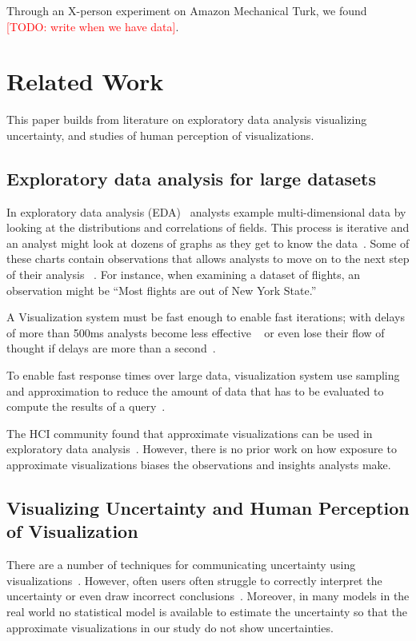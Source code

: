 \documentclass[10pt,journal,compsoc]{IEEEtran}
\newcommand{\note}[2]{\textcolor{#1}{[#2]}}
\newcommand{\todo}[1]{\note{red}{TODO: #1}}
\begin{document}
Through an X-person experiment on Amazon Mechanical Turk, we found \todo{write when we have data}.

\section{Related Work}\label{sec:related_work}

This paper builds from literature on exploratory data analysis visualizing uncertainty, and studies of human perception of visualizations.

\subsection{Exploratory data analysis for large datasets}

In exploratory data analysis (EDA)~\cite{tukey1977exploratory} analysts example multi-dimensional data by looking at the distributions and correlations of fields.
This process is iterative and an analyst might look at dozens of graphs as they get to know the data~\cite{card1991information}. Some of these charts contain observations that allows analysts to move on to the next step of their analysis ~\cite{yi2008understanding}.
For instance, when examining a dataset of flights, an observation might be ``Most flights are out of New York State.''

A Visualization system must be fast enough to enable fast iterations; with delays of more than 500ms analysts become less effective ~\cite{liu2014effects} or even lose their flow of thought if delays are more than a second~\cite{nielsen1993response}. 

To enable fast response times over large data, visualization system use sampling and approximation to reduce the amount of data that has to be evaluated to compute the results of a query~\cite{agarwal2013blinkdb,ding2016sample+,kamat2014distributed}.

The HCI community found that approximate visualizations can be used in exploratory data analysis~\cite{fisher2012trust, moritz2017pangloss}.
However, there is no prior work on how exposure to approximate visualizations biases the observations and insights analysts make.

\subsection{Visualizing Uncertainty and Human Perception of Visualization}

There are a number of techniques for communicating uncertainty using visualizations~\cite{kay2016ish, olston2002visualizing}.
However, often users often struggle to correctly interpret the uncertainty or even draw incorrect conclusions~\cite{joslyn2013decisions}.
Moreover, in many models in the real world no statistical model is available to estimate the uncertainty so that the approximate visualizations in our study do not show uncertainties.
\end{document}
